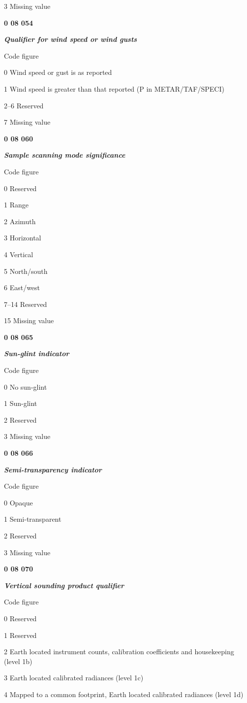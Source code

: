 3 Missing value

\textbf{0 08 054}

\emph{\textbf{Qualifier for wind speed or wind gusts}}

Code figure

0 Wind speed or gust is as reported

1 Wind speed is greater than that reported (P in METAR/TAF/SPECI)

2--6 Reserved

7 Missing value

\textbf{0 08 060}

\emph{\textbf{Sample scanning mode significance}}

Code figure

0 Reserved

1 Range

2 Azimuth

3 Horizontal

4 Vertical

5 North/south

6 East/west

7--14 Reserved

15 Missing value

\textbf{0 08 065}

\emph{\textbf{Sun-glint indicator}}

Code figure

0 No sun-glint

1 Sun-glint

2 Reserved

3 Missing value

\textbf{0 08 066}

\emph{\textbf{Semi-transparency indicator}}

Code figure

0 Opaque

1 Semi-transparent

2 Reserved

3 Missing value

\textbf{0 08 070}

\emph{\textbf{Vertical sounding product qualifier}}

Code figure

0 Reserved

1 Reserved

2 Earth located instrument counts, calibration coefficients and housekeeping (level 1b)

3 Earth located calibrated radiances (level 1c)

4 Mapped to a common footprint, Earth located calibrated radiances (level 1d)

